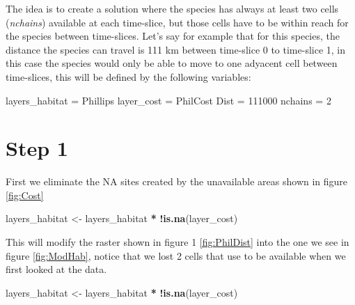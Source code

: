 \documentclass[]{article}
\newenvironment{Shaded}{\begin{snugshade}}{\end{snugshade}}
\newcommand{\DecValTok}[1]{\textcolor[rgb]{0.00,0.00,0.81}{#1}}
\newcommand{\KeywordTok}[1]{\textcolor[rgb]{0.13,0.29,0.53}{\textbf{#1}}}
\newcommand{\NormalTok}[1]{#1}
\newcommand{\OperatorTok}[1]{\textcolor[rgb]{0.81,0.36,0.00}{\textbf{#1}}}
\newcommand{\StringTok}[1]{\textcolor[rgb]{0.31,0.60,0.02}{#1}}
\begin{document}
The idea is to create a solution where the species has always at least two cells (\emph{nchains}) available at each time-slice, but those cells have to be within reach for the species between time-slices. Let's say for example that for this species, the distance the species can travel is 111 km between time-slice 0 to time-slice 1, in this case the species would only be able to move to one adyacent cell between time-slices, this will be defined by the following variables:

\begin{Shaded}
\begin{Highlighting}[]
\NormalTok{layers_habitat =}\StringTok{ }\NormalTok{Phillips}
\NormalTok{layer_cost =}\StringTok{ }\NormalTok{PhilCost}
\NormalTok{Dist =}\StringTok{ }\DecValTok{111000}
\NormalTok{nchains =}\StringTok{ }\DecValTok{2}
\end{Highlighting}
\end{Shaded}

\hypertarget{step-1}{%
\section{Step 1}\label{step-1}}

First we eliminate the NA sites created by the unavailable areas shown in figure \ref{fig:Cost}

\begin{Shaded}
\begin{Highlighting}[]
\NormalTok{layers_habitat <-}\StringTok{ }\NormalTok{layers_habitat }\OperatorTok{*}\StringTok{ }\OperatorTok{!}\KeywordTok{is.na}\NormalTok{(layer_cost)}
\end{Highlighting}
\end{Shaded}

This will modify the raster shown in figure 1 \ref{fig:PhilDist} into the one we see in figure \ref{fig:ModHab}, notice that we lost 2 cells that use to be available when we first looked at the data.

\begin{Shaded}
\begin{Highlighting}[]
\NormalTok{layers_habitat <-}\StringTok{ }\NormalTok{layers_habitat }\OperatorTok{*}\StringTok{ }\OperatorTok{!}\KeywordTok{is.na}\NormalTok{(layer_cost)}
\end{Highlighting}
\end{Shaded}
\end{document}
